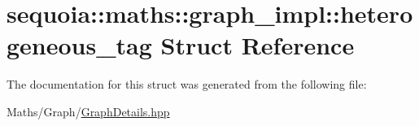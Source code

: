 \hypertarget{structsequoia_1_1maths_1_1graph__impl_1_1heterogeneous__tag}{}\section{sequoia\+::maths\+::graph\+\_\+impl\+::heterogeneous\+\_\+tag Struct Reference}
\label{structsequoia_1_1maths_1_1graph__impl_1_1heterogeneous__tag}


The documentation for this struct was generated from the following file\+:\begin{DoxyCompactItemize}
\item 
Maths/\+Graph/\mbox{\hyperlink{_graph_details_8hpp}{Graph\+Details.\+hpp}}\end{DoxyCompactItemize}
